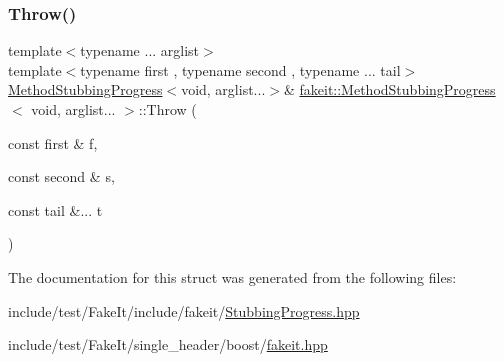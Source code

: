 \mbox{\label{structfakeit_1_1MethodStubbingProgress_3_01void_00_01arglist_8_8_8_01_4_a2db97b61a39cc6cecc379f6d51234c8a}} 
\subsubsection{\texorpdfstring{Throw()}{Throw()}\hspace{0.1cm}{\footnotesize\ttfamily [27/27]}}
{\footnotesize\ttfamily template$<$typename ... arglist$>$ \\
template$<$typename first , typename second , typename ... tail$>$ \\
\mbox{\hyperlink{structfakeit_1_1MethodStubbingProgress}{Method\+Stubbing\+Progress}}$<$void, arglist...$>$\& \mbox{\hyperlink{structfakeit_1_1MethodStubbingProgress}{fakeit\+::\+Method\+Stubbing\+Progress}}$<$ void, arglist... $>$\+::Throw (\begin{DoxyParamCaption}\item[{const first \&}]{f,  }\item[{const second \&}]{s,  }\item[{const tail \&...}]{t }\end{DoxyParamCaption})\hspace{0.3cm}{\ttfamily [inline]}}



The documentation for this struct was generated from the following files\+:\begin{DoxyCompactItemize}
\item 
include/test/\+Fake\+It/include/fakeit/\mbox{\hyperlink{StubbingProgress_8hpp}{Stubbing\+Progress.\+hpp}}\item 
include/test/\+Fake\+It/single\+\_\+header/boost/\mbox{\hyperlink{single__header_2boost_2fakeit_8hpp}{fakeit.\+hpp}}\end{DoxyCompactItemize}
